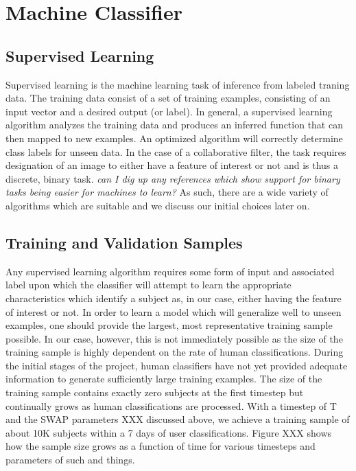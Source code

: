 \documentclass[twocolumn]{aastex6}
\begin{document}
\section{Machine Classifier} \label{sec:machine}
\subsection{Supervised Learning}
Supervised learning is the machine learning task of inference from labeled traning data. The training data consist of a set of training examples, consisting of an input vector and a desired output (or label).  In general, a supervised learning algorithm analyzes the training data and produces an inferred function that can then mapped to new examples. An optimized algorithm will correctly determine class labels for unseen data. In the case of a collaborative filter, the task requires designation of an image to either have a feature of interest or not and is thus a discrete, binary task.  \textit{can I dig up any references which show support for binary tasks being easier for machines to learn?} As such, there are a wide variety of algorithms which are suitable and we discuss our initial choices later on. 

\subsection{Training and Validation Samples}

Any supervised learning algorithm requires some form of input and associated label upon which the classifier will attempt to learn the appropriate characteristics which identify a subject as, in our case, either having the feature of interest or not.  In order to learn a model which will generalize well to unseen examples, one should provide the largest, most representative training sample possible. In our case, however, this is not immediately possible as the size of the training sample is highly dependent on the rate of human classifications. During the initial stages of the project, human classifiers have not yet provided adequate information to generate sufficiently large training examples.  The size of the training sample contains exactly zero subjects at the first timestep but continually grows as human classifications are processed. With a timestep of T and the SWAP parameters XXX discussed above, we achieve a training sample of about 10K subjects within a 7 days of user classifications. Figure XXX shows how the sample size grows as a function of time for various timesteps and parameters of such and things. 
\end{document}
